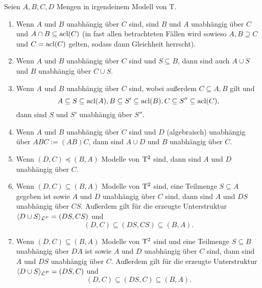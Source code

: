\begin{lemma}\label{Unabhängigkeitsregeln}
	Seien $A,B,C,D$ Mengen in irgendeinem Modell von T.
	\begin{enumerate}
		\item Wenn $A$ und $B$ unabhängig über $C$ sind, sind $B$ und $A$ unabhängig über $C$ und $A\cap B\subseteq\operatorname{acl}(C)$ (in fast allen betrachteten Fällen wird sowieso $A,B\supseteq C$ und $C=\operatorname{acl}(C)$ gelten, sodass dann Gleichheit herrscht).
		\item Wenn $A$ und $B$ unabhängig über $C$ sind und $S\subseteq B$, dann sind auch $A\cup S$ und $B$ unabhängig über $C\cup S$.
		\item Wenn $A$ und $B$ unabhängig über $C$ sind, wobei außerdem $C\subseteq A,B$ gilt und $$A\subseteq S\subseteq\operatorname{acl}(A),B\subseteq S'\subseteq\operatorname{acl}(B),C\subseteq S''\subseteq\operatorname{acl}(C),$$ dann sind $S$ und $S'$ unabhängig über $S''$.
		\item Wenn $A$ und $B$ unabhängig über $C$ sind und $D$ (algebraisch) unabhängig über $ABC:=(AB)C$, dann sind $A\cup D$ und $B$ unabhängig über $C$.
		\item Wenn $(D,C)\preceq(B,A)$ Modelle von $\operatorname{T^2}$ sind, dann sind $A$ und $D$ unabhängig über $C$.
		\item Wenn $(D,C)\subseteq(B,A)$ Modelle von $\operatorname{T^2}$ sind, eine Teilmenge $S\subseteq A$ gegeben ist sowie $A$ und $D$ unabhängig über $C$ sind, dann sind $A$ und $DS$ unabhängig über $CS$. Außerdem gilt für die erzeugte Unterstruktur $\langle D\cup S\rangle_{\mathcal{L}^P}=(DS,CS)$ und $$(D,C)\subseteq(DS,CS)\subseteq(B,A).$$\newpage
		\item Wenn $(D,C)\subseteq(B,A)$ Modelle von $\operatorname{T^2}$ sind und eine Teilmenge $S\subseteq B$ unabhängig über $DA$ ist sowie $A$ und $D$ unabhängig über $C$ sind, dann sind $A$ und $DS$ unabhängig über $C$. Außerdem gilt für die erzeugte Unterstruktur $\langle D\cup S\rangle_{\mathcal{L}^P}=(DS,C)$ und $$(D,C)\subseteq(DS,C)\subseteq(B,A).$$
	\end{enumerate}
\end{lemma}
